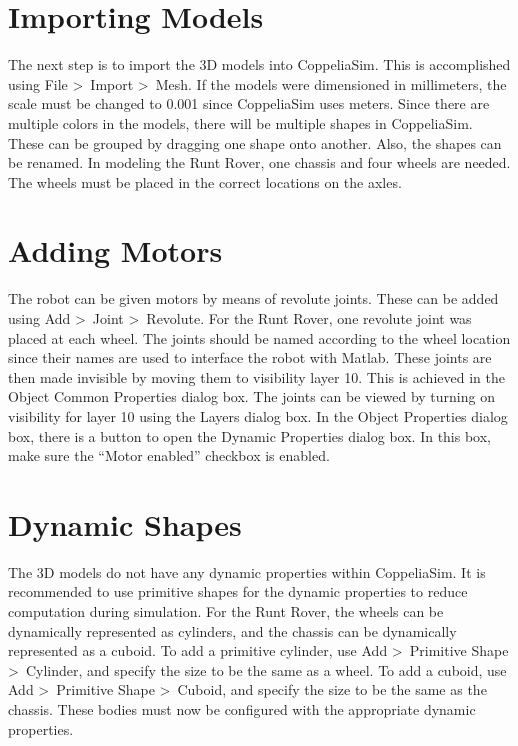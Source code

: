 \section{Importing Models}
The next step is to import the 3D models into CoppeliaSim. This is accomplished using File \textgreater \ Import \textgreater \ Mesh. If the models were dimensioned in millimeters, the scale must be changed to 0.001 since CoppeliaSim uses meters. Since there are multiple colors in the models, there will be multiple shapes in CoppeliaSim. These can be grouped by dragging one shape onto another. Also, the shapes can be renamed. In modeling the Runt Rover, one chassis and four wheels are needed. The wheels must be placed in the correct locations on the axles.

\section{Adding Motors}
The robot can be given motors by means of revolute joints. These can be added using Add \textgreater \ Joint \textgreater \ Revolute. For the Runt Rover, one revolute joint was placed at each wheel. The joints should be named according to the wheel location since their names are used to interface the robot with Matlab. These joints are then made invisible by moving them to visibility layer 10. This is achieved in the Object Common Properties dialog box. The joints can be viewed by turning on visibility for layer 10 using the Layers dialog box. In the Object Properties dialog box, there is a button to open the Dynamic Properties dialog box. In this box, make sure the ``Motor enabled'' checkbox is enabled.

\section{Dynamic Shapes}
The 3D models do not have any dynamic properties within CoppeliaSim. It is recommended to use primitive shapes for the dynamic properties to reduce computation during simulation. For the Runt Rover, the wheels can be dynamically represented as cylinders, and the chassis can be dynamically represented as a cuboid. To add a primitive cylinder, use Add \textgreater \ Primitive Shape \textgreater \ Cylinder, and specify the size to be the same as a wheel. To add a cuboid, use Add \textgreater \ Primitive Shape \textgreater \ Cuboid, and specify the size to be the same as the chassis. These bodies must now be configured with the appropriate dynamic properties.


